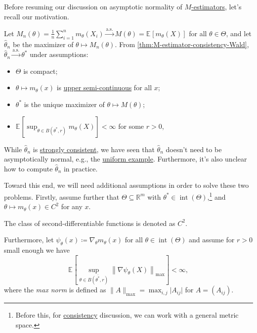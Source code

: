 Before resuming our discussion on asymptotic normality of \hyperref[def:M-estimator]{\(M\)-estimators}, let's recall our motivation.

\begin{prev}
	Let \(M_n(\theta ) = \frac{1}{n}\sum_{i=1}^{n} m_\theta (X_i) \overset{\text{a.s.} }{\to} M(\theta ) = \mathbb{E}_{}[m_\theta (X)] \) for all \(\theta \in \Theta \), and let \(\hat{\theta} _n\) be the maximizer of \(\theta \mapsto M_n(\theta )\). From \autoref{thm:M-estimator-consistency-Wald}, \(\hat{\theta} _n \overset{\text{a.s.} }{\to} \theta ^{\ast} \) under assumptions:
	\begin{itemize}
		\item \(\Theta \) is compact;
		\item \(\theta \mapsto m_\theta (x)\) is \hyperref[def:upper-semi-continuous]{upper semi-continuous} for all \(x\);
		\item \(\theta ^{\ast} \) is the unique maximizer of \(\theta \mapsto M(\theta )\);
		\item \(\mathbb{E}_{}[\sup _{\theta \in B(\theta ^{\ast} , r)} m_\theta (X)] < \infty \) for some \(r > 0\),
	\end{itemize}
	While \(\hat{\theta} _n\) is \hyperref[def:strongly-consistent]{strongly consistent}, we have seen that \(\hat{\theta} _n\) doesn't need to be asymptotically normal, e.g., the \hyperref[eg:uniform-is-not-asymptotically-normal]{uniform example}. Furthermore, it's also unclear how to compute \(\hat{\theta} _n\) in practice.
\end{prev}

Toward this end, we will need additional assumptions in order to solve these two problems. Firstly, assume further that \(\Theta \subseteq \mathbb{R} ^m\) with \(\theta ^{\ast} \in \operatorname{int}(\Theta ) \),\footnote{Before this, for \hyperref[def:consistent]{consistency} discussion, we can work with a general metric space.} and \(\theta \mapsto m_\theta (x) \in C^2\) for any \(x\).

\begin{notation}
	The class of second-differentiable functions is denoted as \(C^2\).
\end{notation}

Furthermore, let \(\psi _\theta (x) \coloneqq \nabla _\theta m_\theta (x)\) for all \(\theta \in \operatorname{int}(\Theta ) \) and assume for \(r > 0\) small enough we have
\[
	\mathbb{E}_{}\left[\sup _{\theta \in \overline{B(\theta ^{\ast} , r )} } \left\lVert \nabla \psi _\theta (X) \right\rVert _{\max }\right] < \infty,
\]
where the \emph{max norm} is defined as \(\lVert A \rVert _{\max } = \max _{i, j} \lvert A_{ij} \rvert \) for \(A = (A_{ij})\).

